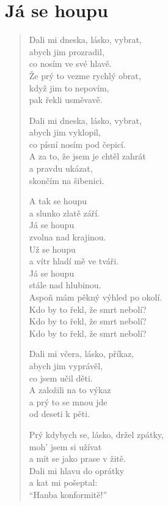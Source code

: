 \section{Já se houpu}

\thispagestyle{empty}

\begin{multicols}{3}


\begin{verse}
	
Dali mi dneska, lásko, vybrat,\\
abych jim prozradil,\\
co nosím ve své hlavě.\\
Že prý to vezme rychlý obrat,\\
když jim to nepovím,\\
pak řekli usměvavě.

Dali mi dneska, lásko, vybrat,\\
abych jim vyklopil,\\
co písní nosím pod čepicí.\\
A za to, že jsem je chtěl zahrát\\
a pravdu ukázat,\\
skončím na šibenici.

A tak se houpu\\
a slunko zlatě září.\\
Já se houpu\\
zvolna nad krajinou.\\
Už se houpu\\
a vítr hladí mě ve tváři.\\
Já se houpu\\
stále nad hlubinou.\\
Aspoň mám pěkný výhled po okolí.\\
Kdo by to řekl, že smrt nebolí?\\
Kdo by to řekl, že smrt nebolí?\\
Kdo by to řekl, že smrt nebolí?

\columnbreak

Dali mi včera, lásko, příkaz,\\
abych jim vyprávěl,\\
co jsem učil děti.\\
A založili na to výkaz\\
a prý to se mnou jde\\
od deseti k pěti.

Prý kdybych se, lásko, držel zpátky,\\
moh’ jsem si užívat\\
a mít se jako prase v žitě.\\
Dali mi hlavu do oprátky\\
a kat mi pošeptal:\\
“Hanba konformitě!”


\end{verse}
\end{multicols}
